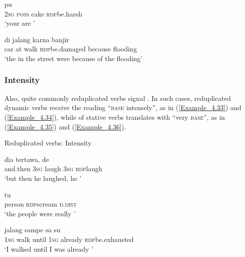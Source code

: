 \ea
\label{Example_4.31}
 {pu} {} {}\\ %
 \textsc{2sg}  \textsc{poss}  cake  \textsc{rdp}{\Tilde}be.harsh\\
\glt 
‘your  are ’ \textstyleExampleSource{[Elicited BR120813.034]}
\z

\ea
\label{Example_4.32}
 {di} {jalang} {} {karna} {banjir}\\ %
 car  at  walk  \textsc{rdp}{\Tilde}be.damaged  because  flooding\\
\glt
‘the  in the street were  because of the flooding’ \textstyleExampleSource{[Elicited BR120813.035]}
\z


\subsubsection[Intensity]{Intensity}\label{Para_4.2.2.3}

Also, quite commonly reduplicated verbs signal . In such cases, reduplicated dynamic verbs receive the reading ``\textsc{base} intensely'', as in (\ref{Example_4.33}) and (\ref{Example_4.34}), while  of stative verbs translates with ``very \textsc{base}'', as in (\ref{Example_4.35}) and (\ref{Example_4.36}).


\begin{styleExampleTitle}
Reduplicated verbs: Intensity
\end{styleExampleTitle}

\ea
\label{Example_4.33}
 {dia} {tertawa}, {de} {}\\ %
 and.then  \textsc{3sg}  laugh  \textsc{3sg}  \textsc{rdp}{\Tilde}laugh\\
\glt 
‘but then he laughed, he ’ \textstyleExampleSource{[080916-001-CvNP.0004]}
\z

\ea
\label{Example_4.34}
 {} {tu}\\ %
 person  \textsc{rdp}{\Tilde}scream  \textsc{d.dist}\\

\glt 
‘the people were really  ’ \textstyleExampleSource{[081006-022-CvEx.0007]}
\z

\ea
\label{Example_4.35}
 {jalang} {sampe} {sa} {su} {}\\ %
 \textsc{1sg}  walk  until  \textsc{1sg}  already  \textsc{rdp}{\Tilde}be.exhausted\\
\glt 
‘I walked until I was already ’ \textstyleExampleSource{[081025-008-Cv.0038]}
\z

